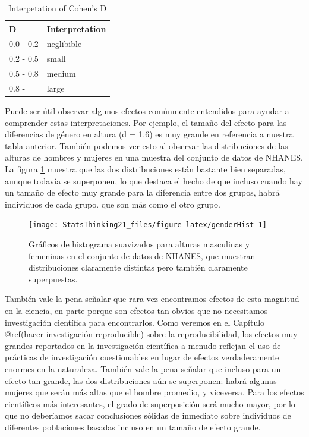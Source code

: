 \documentclass[
  12pt,
]{book}
\theoremstyle{definition}
\theoremstyle{definition}
\theoremstyle{definition}
\theoremstyle{remark}
\begin{document}
\begin{table}

\caption{\label{tab:unnamed-chunk-50}Interpetation of Cohen's D}
\centering
\begin{tabular}[t]{l|l}
\hline
D & Interpretation\\
\hline
0.0 - 0.2 & neglibible\\
\hline
0.2 - 0.5 & small\\
\hline
0.5 - 0.8 & medium\\
\hline
0.8 - & large\\
\hline
\end{tabular}
\end{table}

Puede ser útil observar algunos efectos comúnmente entendidos para ayudar a comprender estas interpretaciones. Por ejemplo, el tamaño del efecto para las diferencias de género en altura (d = 1.6) es muy grande en referencia a nuestra tabla anterior. También podemos ver esto al observar las distribuciones de las alturas de hombres y mujeres en una muestra del conjunto de datos de NHANES. La figura \ref{fig:genderHist} muestra que las dos distribuciones están bastante bien separadas, aunque todavía se superponen, lo que destaca el hecho de que incluso cuando hay un tamaño de efecto muy grande para la diferencia entre dos grupos, habrá individuos de cada grupo. que son más como el otro grupo.

\begin{figure}
\texttt{[image: StatsThinking21\_files/figure-latex/genderHist-1]} \caption{Gráficos de histograma suavizados para alturas masculinas y femeninas en el conjunto de datos de NHANES, que muestran distribuciones claramente distintas pero también claramente superpuestas.}\label{fig:genderHist}
\end{figure}

También vale la pena señalar que rara vez encontramos efectos de esta magnitud en la ciencia, en parte porque son efectos tan obvios que no necesitamos investigación científica para encontrarlos. Como veremos en el Capítulo @ref(hacer-investigación-reproducible) sobre la reproducibilidad, los efectos muy grandes reportados en la investigación científica a menudo reflejan el uso de prácticas de investigación cuestionables en lugar de efectos verdaderamente enormes en la naturaleza. También vale la pena señalar que incluso para un efecto tan grande, las dos distribuciones aún se superponen: habrá algunas mujeres que serán más altas que el hombre promedio, y viceversa. Para los efectos científicos más interesantes, el grado de superposición será mucho mayor, por lo que no deberíamos sacar conclusiones sólidas de inmediato sobre individuos de diferentes poblaciones basadas incluso en un tamaño de efecto grande.
\end{document}
